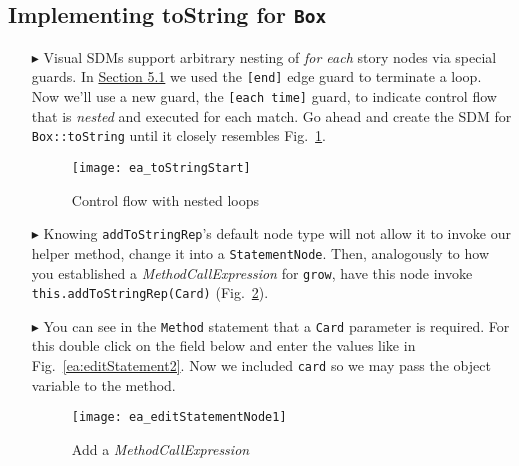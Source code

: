 \newpage
\hypertarget{stringRep vis}{}
\subsection{Implementing toString for \texttt{Box}}
\genHeader

\begin{itemize}

\item[$\blacktriangleright$] Visual SDMs support arbitrary nesting of \emph{for each} story nodes via special guards. In \hyperlink{emptyPartition vis}{Section
5.1} we used the \texttt{[end]} edge guard to terminate a loop. Now we'll use a new guard, the \texttt{[each time]} guard, to indicate
control flow that is \emph{nested} and executed for each match. Go ahead and create the SDM for \texttt{Box::toString} until it closely resembles
Fig.~\ref{ea:sdm_tostring_1}.

\begin{figure}[htbp]
\begin{center}
  \texttt{[image: ea\_toStringStart]}
  \caption{Control flow with nested loops} 
  \label{ea:sdm_tostring_1}
\end{center}
\end{figure}

\clearpage

\item[$\blacktriangleright$] Knowing \texttt{addToStringRep}'s default node type will not allow it to invoke our helper method, change it
into a \texttt{StatementNode}. Then, analogously to how you established a \emph{MethodCallExpression} for \texttt{grow}, have this node invoke
\texttt{this.addToStringRep(Card)} (Fig.~\ref{ea:editStatement1}). 

\vspace{0.5cm}

\item[$\blacktriangleright$] You can see in the \texttt{Method} statement that a \texttt{Card} parameter is required. For this double click on the field below and enter the values like in Fig.~\ref{ea:editStatement2}. Now we included \texttt{card} so we may pass the object variable to the method.

\vspace{0.5cm}

\begin{figure}[htbp]
\begin{center}
  \texttt{[image: ea\_editStatementNode1]}
  \caption{Add a \emph{MethodCallExpression}}
  \label{ea:editStatement1}
\end{center}
\end{figure}


\end{itemize}
